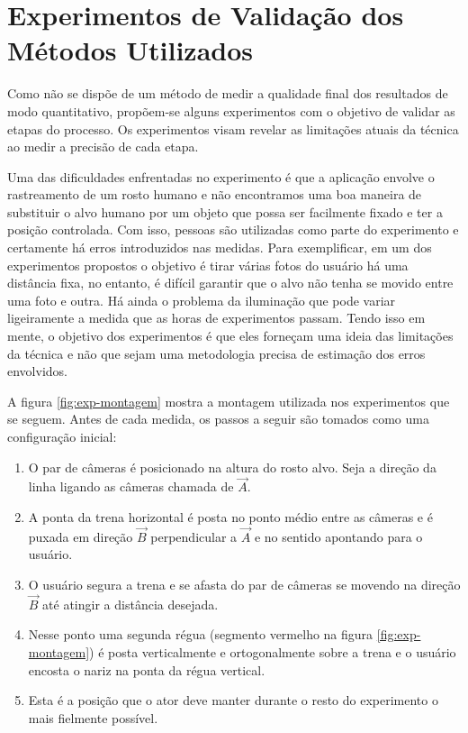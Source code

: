 

\section{Experimentos de Validação dos Métodos Utilizados}

Como não se dispõe de um método de medir a qualidade final dos resultados de modo quantitativo, propõem-se alguns experimentos com o objetivo de validar as etapas do processo. Os experimentos visam revelar as limitações atuais da técnica ao medir a precisão de cada etapa.

Uma das dificuldades enfrentadas no experimento é que a aplicação envolve o rastreamento de um rosto humano e não encontramos uma boa maneira de substituir o alvo humano por um objeto que possa ser facilmente fixado e ter a posição controlada. Com isso, pessoas são utilizadas como parte do experimento e certamente há erros introduzidos nas medidas. Para exemplificar, em um dos experimentos propostos o objetivo é tirar várias fotos do usuário há uma distância fixa, no entanto, é difícil garantir que o alvo não tenha se movido entre uma foto e outra. Há ainda o problema da iluminação que pode variar ligeiramente a medida que as horas de experimentos passam. Tendo isso em mente, o objetivo dos experimentos é que eles forneçam uma ideia das limitações da técnica e não que sejam uma metodologia precisa de estimação dos erros envolvidos.

A figura \ref{fig:exp-montagem} mostra a montagem utilizada nos experimentos que se seguem. Antes de cada medida, os passos a seguir são tomados como uma configuração inicial:

\begin{enumerate}
\item O par de câmeras é posicionado na altura do rosto alvo. Seja a direção da linha ligando as câmeras chamada de $\vec{A}$.
\item A ponta da trena horizontal é posta no ponto médio entre as câmeras e é puxada em direção $\vec{B}$ perpendicular a $\vec{A}$ e no sentido apontando para o usuário.
\item O usuário segura a trena e se afasta do par de câmeras se movendo na direção $\vec{B}$ até atingir a distância desejada.
\item Nesse ponto uma segunda régua (segmento vermelho na figura \ref{fig:exp-montagem}) é posta verticalmente e ortogonalmente sobre a trena e o usuário encosta o nariz na ponta da régua vertical. 
\item Esta é a posição que o ator deve manter durante o resto do experimento o mais fielmente possível.
\end{enumerate}

